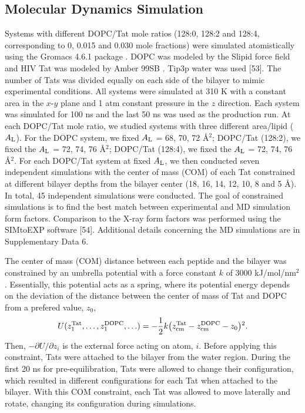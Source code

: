 \subsection{Molecular Dynamics Simulation}
Systems with different DOPC/Tat mole ratios (128:0, 128:2 and 128:4, corresponding to
0, 0.015 and 0.030 mole fractions) were simulated atomistically using the Gromacs 4.6.1
package \cite{ref:Hess08}. 
DOPC was modeled by the Slipid force field 
\cite{ref:Jambeck12_JPCB,ref:Jambeck12_JCTC} 
and HIV Tat was modeled by Amber 99SB \cite{ref:Hornak06}. 
Tip3p water was used [53]. The number of Tats was divided equally on
each side of the bilayer to mimic experimental conditions. All systems were simulated at 310 K
with a constant area in the $x$-$y$ plane and 1 atm constant pressure in the $z$ direction. Each
system was simulated for 100 ns and the last 50 ns was used as the production run.
At each DOPC/Tat mole ratio, we studied systems with three different area/lipid ($A_\textrm{L}$).
For the DOPC system, we fixed $A_\textrm{L}$ = 68, 70, 72 \AA$^2$; 
DOPC/Tat (128:2), we fixed the $A_\textrm{L}$ = 72, 74, 76 \AA$^2$; 
DOPC/Tat (128:4), we fixed the $A_\textrm{L}$ = 72, 74, 76 \AA$^2$. 
For each DOPC/Tat system at fixed $A_\textrm{L}$, 
we then conducted seven independent simulations with the center of mass (COM) of
each Tat constrained at different bilayer depths from the bilayer center 
(18, 16, 14, 12, 10, 8 and 5 \AA). 
In total, 45 independent simulations were conducted. 
The goal of constrained simulations is to find the best match between 
experimental and MD simulation form factors. Comparison to
the X-ray form factors was performed using the SIMtoEXP software [54]. 
Additional details concerning the MD simulations are in Supplementary Data 6.

The center of mass (COM) distance between each peptide and the bilayer was 
constrained by an umbrella potential with a force constant $k$ of 3000 kJ/mol/nm$^2$. 
Essentially, this potential acts as a spring, 
where its potential energy depends on the deviation of the distance 
between the center of mass of Tat and DOPC from a prefered value, $z_0$,
\begin{equation*}
  U(z_1^{\textrm{Tat}},\ldots,z_1^{\textrm{DOPC}},\ldots) = 
  -\frac{1}{2} k 
  \mathopen{}\left( z_{\textrm{cm}}^{\textrm{Tat}} - z_{\textrm{cm}}^{\textrm{DOPC}} - z_0 \right)\mathclose{}^2.
\end{equation*}
Then, $-\partial U/\partial z_i$ is the external force acting 
on atom, $i$. Before applying this constraint, Tats were attached to 
the bilayer from the water region. During the first 20 ns for 
pre-equilibration, Tats were allowed to change their configuration,
which resulted in different configurations for each Tat when attached
to the bilayer. With this COM constraint, each Tat was allowed to move
laterally and rotate, changing its configuration during simulations.

